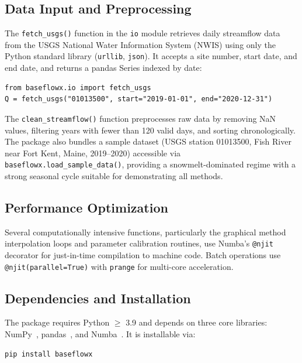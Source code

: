 \documentclass[hydrology,article,submit,pdftex,moreauthors]{Definitions/mdpi}
\begin{document}
\subsection{Data Input and Preprocessing}
\label{sec:data_input}

The \texttt{fetch\_usgs()} function in the \texttt{io} module retrieves daily streamflow data from the USGS National Water Information System (NWIS) using only the Python standard library (\texttt{urllib}, \texttt{json}). It accepts a site number, start date, and end date, and returns a pandas Series indexed by date:

\begin{lstlisting}
from baseflowx.io import fetch_usgs
Q = fetch_usgs("01013500", start="2019-01-01", end="2020-12-31")
\end{lstlisting}

The \texttt{clean\_streamflow()} function preprocesses raw data by removing NaN values, filtering years with fewer than 120 valid days, and sorting chronologically. The package also bundles a sample dataset (USGS station 01013500, Fish River near Fort Kent, Maine, 2019--2020) accessible via \texttt{baseflowx.load\_sample\_data()}, providing a snowmelt-dominated regime with a strong seasonal cycle suitable for demonstrating all methods.

\subsection{Performance Optimization}
\label{sec:performance}

Several computationally intensive functions, particularly the graphical method interpolation loops and parameter calibration routines, use Numba's \texttt{@njit} decorator for just-in-time compilation to machine code. Batch operations use \texttt{@njit(parallel=True)} with \texttt{prange} for multi-core acceleration.

\subsection{Dependencies and Installation}
\label{sec:dependencies}

The package requires Python $\geq$ 3.9 and depends on three core libraries: NumPy~\cite{Harris2020}, pandas~\cite{McKinney2010}, and Numba~\cite{Lam2015}. It is installable via:

\begin{lstlisting}[numbers=none]
pip install baseflowx
\end{lstlisting}
\end{document}
